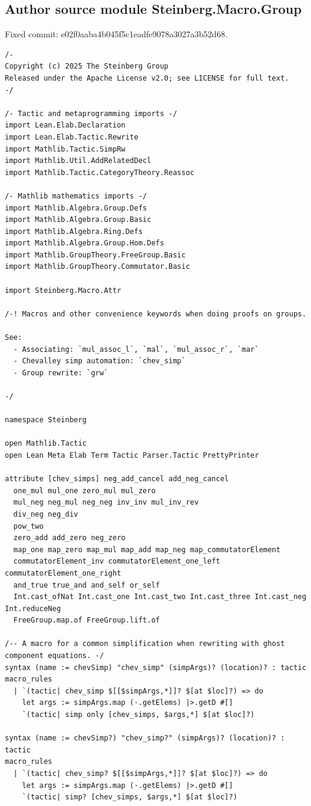 \documentclass[10pt,a4paper]{article}
\begin{document}
\subsection*{Author source module Steinberg.Macro.Group}
\noindent Fixed commit: e02f0aaba4b045f5c1eadfe9078a3027a3b52d68.
\begin{Verbatim}
/-
Copyright (c) 2025 The Steinberg Group
Released under the Apache License v2.0; see LICENSE for full text.
-/

/- Tactic and metaprogramming imports -/
import Lean.Elab.Declaration
import Lean.Elab.Tactic.Rewrite
import Mathlib.Tactic.SimpRw
import Mathlib.Util.AddRelatedDecl
import Mathlib.Tactic.CategoryTheory.Reassoc

/- Mathlib mathematics imports -/
import Mathlib.Algebra.Group.Defs
import Mathlib.Algebra.Group.Basic
import Mathlib.Algebra.Ring.Defs
import Mathlib.Algebra.Group.Hom.Defs
import Mathlib.GroupTheory.FreeGroup.Basic
import Mathlib.GroupTheory.Commutator.Basic

import Steinberg.Macro.Attr

/-! Macros and other convenience keywords when doing proofs on groups.

See:
  - Associating: `mul_assoc_l`, `mal`, `mul_assoc_r`, `mar`
  - Chevalley simp automation: `chev_simp`
  - Group rewrite: `grw`

-/

namespace Steinberg

open Mathlib.Tactic
open Lean Meta Elab Term Tactic Parser.Tactic PrettyPrinter

attribute [chev_simps] neg_add_cancel add_neg_cancel
  one_mul mul_one zero_mul mul_zero
  mul_neg neg_mul neg_neg inv_inv mul_inv_rev
  div_neg neg_div
  pow_two
  zero_add add_zero neg_zero
  map_one map_zero map_mul map_add map_neg map_commutatorElement
  commutatorElement_inv commutatorElement_one_left commutatorElement_one_right
  and_true true_and and_self or_self
  Int.cast_ofNat Int.cast_one Int.cast_two Int.cast_three Int.cast_neg Int.reduceNeg
  FreeGroup.map.of FreeGroup.lift.of

/-- A macro for a common simplification when rewriting with ghost component equations. -/
syntax (name := chevSimp) "chev_simp" (simpArgs)? (location)? : tactic
macro_rules
  | `(tactic| chev_simp $[[$simpArgs,*]]? $[at $loc]?) => do
    let args := simpArgs.map (·.getElems) |>.getD #[]
    `(tactic| simp only [chev_simps, $args,*] $[at $loc]?)

syntax (name := chevSimp?) "chev_simp?" (simpArgs)? (location)? : tactic
macro_rules
  | `(tactic| chev_simp? $[[$simpArgs,*]]? $[at $loc]?) => do
    let args := simpArgs.map (·.getElems) |>.getD #[]
    `(tactic| simp? [chev_simps, $args,*] $[at $loc]?)


\end{Verbatim}
\end{document}

